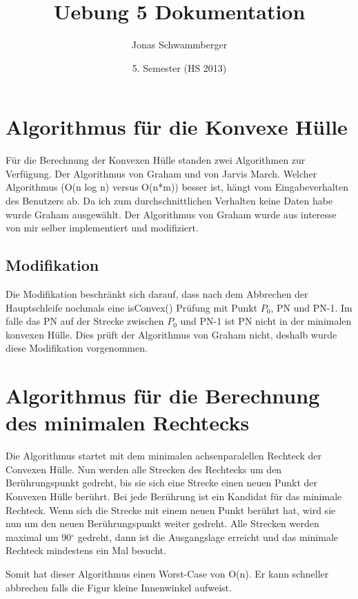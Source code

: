 \documentclass[10pt]{article}
\title{
	\vspace{5cm}
	Uebung 5 Dokumentation
}
\author{Jonas Schwammberger}
\date{5. Semester (HS 2013)}
\begin{document}
\maketitle
\thispagestyle{fancy}

\newpage



\newpage
\setcounter{page}{1}



\section{Algorithmus für die Konvexe Hülle}
Für die Berechnung der Konvexen Hülle standen zwei Algorithmen zur Verfügung. Der Algorithmus von Graham und von Jarvis March. Welcher Algorithmus (O(n log n) versus O(n*m)) besser ist, hängt vom Eingabeverhalten des Benutzers ab. Da ich zum durchschnittlichen Verhalten keine Daten habe wurde Graham ausgewählt. Der Algorithmus von Graham wurde aus interesse von mir selber implementiert und modifiziert.

\subsection{Modifikation}
Die Modifikation beschränkt sich darauf, dass nach dem Abbrechen der Hauptschleife nochmals eine isConvex() Prüfung mit Punkt $P_{0}$, PN und PN-1. Im falle das PN auf der Strecke zwischen $P_{0}$ und PN-1 ist PN nicht in der minimalen konvexen Hülle. Dies prüft der Algorithmus von Graham nicht, deshalb wurde diese Modifikation vorgenommen.

\section{Algorithmus für die Berechnung des minimalen Rechtecks}
Die Algorithmus startet mit dem minimalen achsenparalellen Rechteck der Convexen Hülle. Nun werden alle Strecken des Rechtecks um den Berührungspunkt gedreht, bis sie sich eine Strecke einen neuen Punkt der Konvexen Hülle berührt. Bei jede Berührung ist ein Kandidat für das minimale Rechteck. Wenn sich die Strecke mit einem neuen Punkt berührt hat, wird sie nun um den neuen Berührungspunkt weiter gedreht. Alle Strecken werden maximal um 90$^\circ$ gedreht, dann ist die Ausgangslage erreicht und das minimale Rechteck mindestens ein Mal besucht.

Somit hat dieser Algorithmus einen Worst-Case von O(n). Er kann schneller abbrechen falls die Figur kleine Innenwinkel aufweist.
\end{document}
